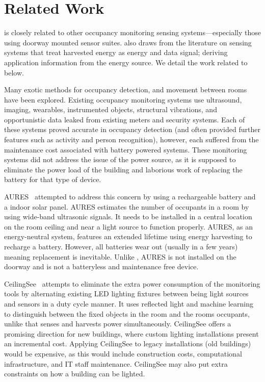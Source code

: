 \section{Related Work}
\label{sec:related}

\sysname is closely related to other occupancy monitoring sensing systems---especially those using doorway mounted sensor suites.
\sysname also draws from the literature on sensing systems that treat harvested energy as energy and data signal; deriving application information from the energy source.
We detail the work related to \sysname below.

Many exotic methods for occupancy detection, and movement between rooms have been explored. Existing occupancy monitoring systems use ultrasound\cite{hnat2012doorjamb}, imaging\cite{tyndall2016occupancy, teixeira2007lightweight}, wearables\cite{fishkin2005hands}, instrumented objects\cite{buettner2009activity}, structural vibrations\cite{pan2016occupant}, and opportunistic data leaked from existing meters and security systems\cite{yangoccupancy2014}.
Each of these systems proved accurate in occupancy detection (and often provided further features such as activity and person recognition), however, each suffered from the maintenance cost associated with battery powered systems.
These monitoring systems did not address the issue of the power source, as it is supposed to eliminate the power load of the building and laborious work of replacing the battery for that type of device.

AURES~\cite{shih2016aures} attempted to address this concern by using a rechargeable battery and a indoor solar panel.
AURES estimates the number of occupants in a room by using wide-band ultrasonic signals. It needs to be installed in a central location on the room ceiling and near a light source to function properly.
AURES, as an energy-neutral system, features an extended lifetime using energy harvesting to recharge a battery.
However, all batteries wear out (usually in a few years) meaning replacement is inevitable.
Unlike \sysname, AURES is not installed on the doorway and is not a batteryless and maintenance free device.

CeilingSee~\cite{yang2017ceilingsee} attempts to eliminate the extra power consumption of the monitoring tools by alternating existing LED lighting fixtures between being light sources and sensors in a duty cycle manner.
It uses reflected light and machine learning to distinguish between the fixed objects in the room and the rooms occupants, unlike \sysname that senses and harvests power simultaneously.
CeilingSee offers a promising direction for new buildings, where custom lighting installations present an incremental cost. Applying CeilingSee to legacy installations (old buildings) would be expensive, as this would include construction costs, computational infrastructure, and IT staff maintenance. CeilingSee may also put extra constraints on how a building can be lighted.

